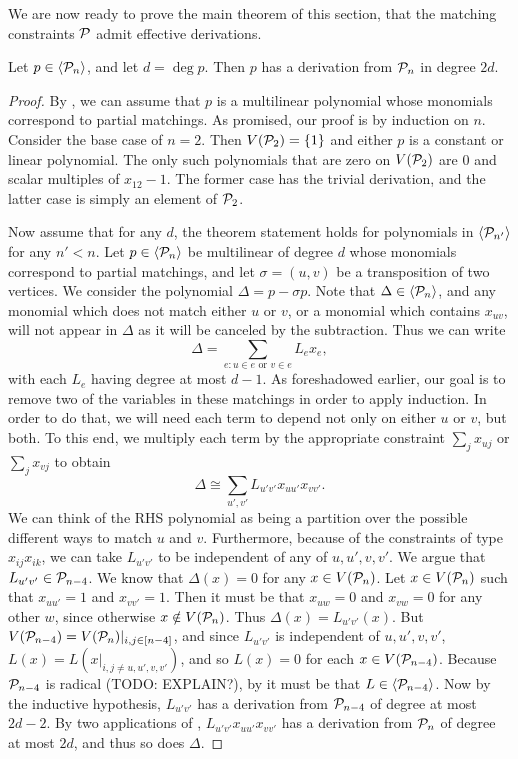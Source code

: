 We are now ready to prove the main theorem of this section, that the matching constraints $\mathcal P$ admit effective derivations. 
\begin{theorem}\label{thm:matching-effective}
Let $p \in \langle \mathcal P_n \rangle$, and let $d = \deg p$. Then $p$ has a derivation from $\mathcal P_n$ in degree $2d$. 
\end{theorem}
\begin{proof}
By , we can assume that $p$ is a multilinear polynomial whose monomials correspond to partial matchings.
As promised, our proof is by induction on $n$. Consider the base case of $n = 2$. 
Then $V(\mathcal P_2) = \{1\}$ and either $p$ is a constant or linear polynomial.
The only such polynomials that are zero on $V(\mathcal P_2)$ are $0$ and scalar multiples of $x_{12} - 1$. 
The former case has the trivial derivation, and the latter case is simply an element of $\mathcal P_2$. 

Now assume that for any $d$, the theorem statement holds for polynomials in $\langle \mathcal P_{n'} \rangle$ for any $n' < n$. 
Let $p \in \langle \mathcal P_n \rangle$ be multilinear of degree $d$ whose monomials correspond to partial matchings, and let $\sigma = (u,v)$ be a transposition of two vertices.
We consider the polynomial $\Delta = p - \sigma p$. Note that $\Delta \in \langle \mathcal P_n \rangle$, and any monomial which does not match either $u$ or $v$, or a monomial which contains $x_{uv}$, will not appear in $\Delta$ as it will be canceled by the subtraction.
Thus we can write
\[\Delta = \sum_{e: u \in e \text{ or } v \in e} L_e x_e,\]
with each $L_e$ having degree at most $d-1$. As foreshadowed earlier, our goal is to remove two of the variables in these matchings in order to apply induction. In order to do that, we will need each term to depend not only on either $u$ or $v$, but both. To this end, we multiply each term by the appropriate constraint $\sum_j x_{uj}$ or $\sum_j x_{vj}$ to obtain
\[\Delta \cong \sum_{u',v'} L_{u'v'} x_{uu'}x_{vv'}.\]
We can think of the RHS polynomial as being a partition over the possible different ways to match $u$ and $v$.
Furthermore, because of the constraints of type $x_{ij}x_{ik}$, we can take $L_{u'v'}$ to be independent of any of $u,u',v,v'$. 
We argue that $L_{u'v'} \in \mathcal P_{n-4}$. We know that $\Delta(x) = 0$ for any $x \in V(\mathcal P_n)$. Let $x \in V(\mathcal P_n)$ such that $x_{uu'} = 1$ and $x_{vv'} = 1$. 
Then it must be that $x_{uw} = 0$ and $x_{vw} = 0$ for any other $w$, since otherwise $x \notin V(\mathcal P_n)$.
Thus $\Delta(x) = L_{u'v'}(x)$. But $V(\mathcal P_{n-4}) = V(\mathcal P_n)|_{i,j \in [n-4]}$, and since $L_{u'v'}$ is independent of $u,u',v,v'$, $L(x) = L(x|_{i,j \neq u,u',v,v'})$, and so $L(x) = 0$ for each $x \in V(\mathcal P_{n-4})$. Because $\mathcal P_{n-4}$ is radical (TODO: EXPLAIN?), by  it must be that $L \in \langle \mathcal P_{n-4} \rangle$. Now by the inductive hypothesis, $L_{u'v'}$ has a derivation from $\mathcal P_{n-4}$ of degree at most $2d-2$. By two applications of , $L_{u'v'}x_{uu'}x_{vv'}$ has a derivation from $\mathcal P_n$ of degree at most $2d$, and thus so does $\Delta$.


\end{proof}
